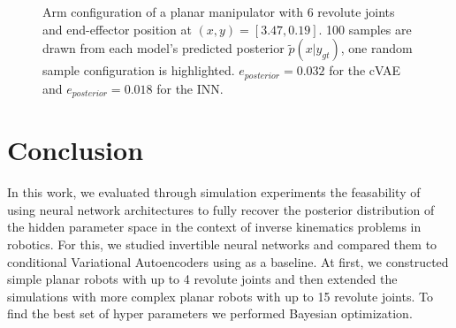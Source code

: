 \documentclass[conference]{IEEEtran}
\begin{document}
\begin{figure}[tbh]
\centering

    \caption{\label{fig:posterior:6dof} Arm configuration of a planar manipulator with $6$ revolute joints and end-effector position at $(x, y) = [3.47, 0.19]$. 100 samples are drawn from each model's predicted posterior $\tilde{p}(x | y_{gt})$, one random sample configuration is highlighted. $e_{posterior} = 0.032$ for the cVAE and $e_{posterior} = 0.018$ for the INN.}
\end{figure}

\section*{Conclusion}

In this work, we evaluated through simulation experiments the feasability of using neural network architectures to fully recover the posterior distribution of the hidden parameter space in the context of inverse kinematics problems in robotics. For this, we studied invertible neural networks and compared them to conditional Variational Autoencoders using as a baseline. At first, we constructed simple planar robots with up to 4 revolute joints and then extended the simulations with more complex planar robots with up to 15 revolute joints. To find the best set of hyper parameters we performed Bayesian optimization.
\end{document}
